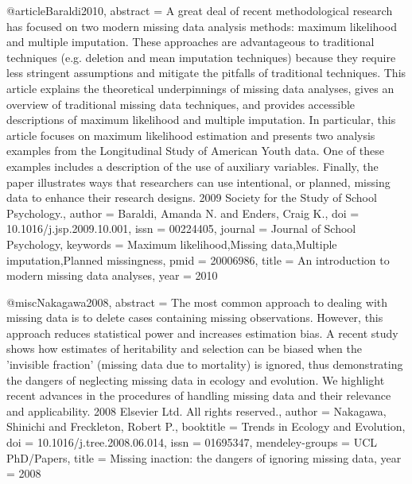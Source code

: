 {{{{{{@article{Baraldi2010,
abstract = {A great deal of recent methodological research has focused on two modern missing data analysis methods: maximum likelihood and multiple imputation. These approaches are advantageous to traditional techniques (e.g. deletion and mean imputation techniques) because they require less stringent assumptions and mitigate the pitfalls of traditional techniques. This article explains the theoretical underpinnings of missing data analyses, gives an overview of traditional missing data techniques, and provides accessible descriptions of maximum likelihood and multiple imputation. In particular, this article focuses on maximum likelihood estimation and presents two analysis examples from the Longitudinal Study of American Youth data. One of these examples includes a description of the use of auxiliary variables. Finally, the paper illustrates ways that researchers can use intentional, or planned, missing data to enhance their research designs. {\textcopyright} 2009 Society for the Study of School Psychology.},
author = {Baraldi, Amanda N. and Enders, Craig K.},
doi = {10.1016/j.jsp.2009.10.001},
issn = {00224405},
journal = {Journal of School Psychology},
keywords = {Maximum likelihood,Missing data,Multiple imputation,Planned missingness},
pmid = {20006986},
title = {{An introduction to modern missing data analyses}},
year = {2010}
}

@misc{Nakagawa2008,
abstract = {The most common approach to dealing with missing data is to delete cases containing missing observations. However, this approach reduces statistical power and increases estimation bias. A recent study shows how estimates of heritability and selection can be biased when the 'invisible fraction' (missing data due to mortality) is ignored, thus demonstrating the dangers of neglecting missing data in ecology and evolution. We highlight recent advances in the procedures of handling missing data and their relevance and applicability. {\textcopyright} 2008 Elsevier Ltd. All rights reserved.},
author = {Nakagawa, Shinichi and Freckleton, Robert P.},
booktitle = {Trends in Ecology and Evolution},
doi = {10.1016/j.tree.2008.06.014},
issn = {01695347},
mendeley-groups = {UCL PhD/Papers},
title = {{Missing inaction: the dangers of ignoring missing data}},
year = {2008}
}

}}}}}}
